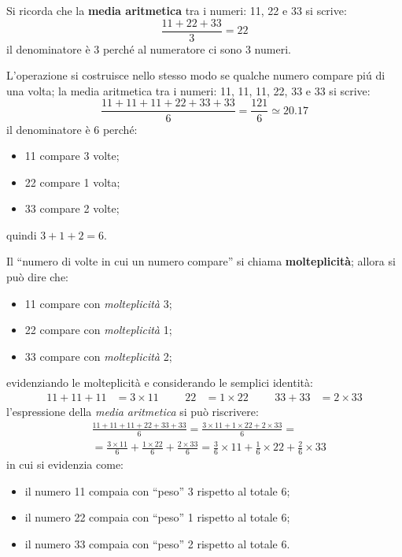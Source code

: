 \documentclass[12pt,a4paper]{article}
\begin{document}
Si  ricorda che  la  \textbf{media aritmetica}  tra i  numeri:  \num{11}, \num{22}  e
\num{33} si scrive:
\begin{equation*}
  \frac{\num{11} + \num{22} + \num{33}}{3} = \num{22}
\end{equation*}
il denominatore è \num{3} perché al numeratore ci sono \num{3} numeri.

L'operazione si  costruisce nello stesso  modo se qualche  numero compare piú  di una
volta;  la media  aritmetica tra  i numeri:  \num{11}, \num{11},  \num{11}, \num{22},
\num{33} e \num{33} si scrive:
\begin{equation*}
  \frac{\num{11} + \num{11} + \num{11} + \num{22} + \num{33} + \num{33}}{6}
  = \frac{121}{6} \simeq \num{20,17}
\end{equation*}
il denominatore è \num{6} perché:
\begin{itemize}
\item \num{11} compare \num{3} volte;
\item \num{22} compare \num{1} volta;
\item \num{33} compare \num{2} volte;
\end{itemize}
quindi \(\num{3} + \num{1} + \num{2} = \num{6}\).

Il ``numero  di volte  in cui  un numero  compare'' si  chiama \textbf{molteplicità};
allora si può dire che:
\begin{itemize}
\item \num{11} compare con \emph{molteplicità} \num{3};
\item \num{22} compare con \emph{molteplicità} \num{1};
\item \num{33} compare con \emph{molteplicità} \num{2};
\end{itemize}
evidenziando le molteplicità e considerando le semplici identità:
\begin{align*}
  \num{11} + \num{11} + \num{11} &= \num{3} \times{} \num{11} &&&
  \num{22} &= \num{1} \times{} \num{22} &&&
  \num{33} + \num{33} &= \num{2} \times{} \num{33}
\end{align*}
l'espressione della \emph{media aritmetica} si può riscrivere:
\begin{align*}
  &\frac{\num{11} + \num{11} + \num{11} + \num{22} + \num{33} + \num{33}}{6}
  = \frac{\num{3} \times{} \num{11}
    + \num{1} \times{} \num{22}
    + \num{2} \times{} \num{33}}
    {6} = \\
  &=
    \frac{\num{3} \times{} \num{11}}{6} +
    \frac{\num{1} \times{} \num{22}}{6} +
    \frac{\num{2} \times{} \num{33}}{6}
  =
    \frac{\num{3}}{6} \times{} \num{11} +
    \frac{\num{1}}{6} \times{} \num{22} +
    \frac{\num{2}}{6} \times{} \num{33}
\end{align*}
in cui si evidenzia come:
\begin{itemize}
\item il numero \num{11} compaia con ``peso'' \num{3} rispetto al totale \num{6};
\item il numero \num{22} compaia con ``peso'' \num{1} rispetto al totale \num{6};
\item il numero \num{33} compaia con ``peso'' \num{2} rispetto al totale \num{6}.
\end{itemize}
\end{document}
